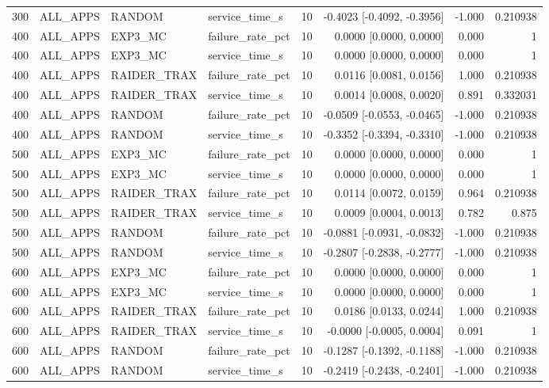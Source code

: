 \begin{tabular}{rlllrrrr}
300 & ALL\_APPS & RANDOM & service\_time\_s & 10 & -0.4023 [-0.4092, -0.3956] & -1.000 & 0.210938 \\
400 & ALL\_APPS & EXP3\_MC & failure\_rate\_pct & 10 & 0.0000 [0.0000, 0.0000] & 0.000 & 1 \\
400 & ALL\_APPS & EXP3\_MC & service\_time\_s & 10 & 0.0000 [0.0000, 0.0000] & 0.000 & 1 \\
400 & ALL\_APPS & RAIDER\_TRAX & failure\_rate\_pct & 10 & 0.0116 [0.0081, 0.0156] & 1.000 & 0.210938 \\
400 & ALL\_APPS & RAIDER\_TRAX & service\_time\_s & 10 & 0.0014 [0.0008, 0.0020] & 0.891 & 0.332031 \\
400 & ALL\_APPS & RANDOM & failure\_rate\_pct & 10 & -0.0509 [-0.0553, -0.0465] & -1.000 & 0.210938 \\
400 & ALL\_APPS & RANDOM & service\_time\_s & 10 & -0.3352 [-0.3394, -0.3310] & -1.000 & 0.210938 \\
500 & ALL\_APPS & EXP3\_MC & failure\_rate\_pct & 10 & 0.0000 [0.0000, 0.0000] & 0.000 & 1 \\
500 & ALL\_APPS & EXP3\_MC & service\_time\_s & 10 & 0.0000 [0.0000, 0.0000] & 0.000 & 1 \\
500 & ALL\_APPS & RAIDER\_TRAX & failure\_rate\_pct & 10 & 0.0114 [0.0072, 0.0159] & 0.964 & 0.210938 \\
500 & ALL\_APPS & RAIDER\_TRAX & service\_time\_s & 10 & 0.0009 [0.0004, 0.0013] & 0.782 & 0.875 \\
500 & ALL\_APPS & RANDOM & failure\_rate\_pct & 10 & -0.0881 [-0.0931, -0.0832] & -1.000 & 0.210938 \\
500 & ALL\_APPS & RANDOM & service\_time\_s & 10 & -0.2807 [-0.2838, -0.2777] & -1.000 & 0.210938 \\
600 & ALL\_APPS & EXP3\_MC & failure\_rate\_pct & 10 & 0.0000 [0.0000, 0.0000] & 0.000 & 1 \\
600 & ALL\_APPS & EXP3\_MC & service\_time\_s & 10 & 0.0000 [0.0000, 0.0000] & 0.000 & 1 \\
600 & ALL\_APPS & RAIDER\_TRAX & failure\_rate\_pct & 10 & 0.0186 [0.0133, 0.0244] & 1.000 & 0.210938 \\
600 & ALL\_APPS & RAIDER\_TRAX & service\_time\_s & 10 & -0.0000 [-0.0005, 0.0004] & 0.091 & 1 \\
600 & ALL\_APPS & RANDOM & failure\_rate\_pct & 10 & -0.1287 [-0.1392, -0.1188] & -1.000 & 0.210938 \\
600 & ALL\_APPS & RANDOM & service\_time\_s & 10 & -0.2419 [-0.2438, -0.2401] & -1.000 & 0.210938 \\

\end{tabular}
